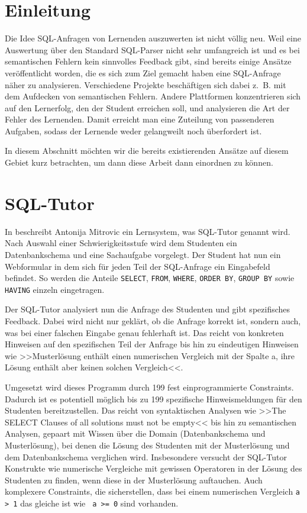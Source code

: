 \section{Einleitung}

Die Idee SQL-Anfragen von Lernenden auszuwerten ist nicht völlig neu. Weil eine Auswertung über den Standard SQL-Parser nicht sehr umfangreich ist und es bei semantischen Fehlern kein sinnvolles Feedback gibt, sind bereits einige Ansätze veröffentlicht worden, die es sich zum Ziel gemacht haben eine SQL-Anfrage näher zu analysieren. Verschiedene Projekte beschäftigen sich dabei \mbox{z. B.} mit dem Aufdecken von semantischen Fehlern. Andere Plattformen konzentrieren sich auf den Lernerfolg, den der Student erreichen soll, und analysieren die Art der Fehler des Lernenden. Damit erreicht man eine Zuteilung von passenderen Aufgaben, sodass der Lernende weder gelangweilt noch überfordert ist. %

In diesem Abschnitt möchten wir die bereits existierenden Ansätze auf diesem Gebiet kurz betrachten, um dann diese Arbeit dann einordnen zu können.

\section{SQL-Tutor}

In \cite{sqltut1} beschreibt Antonija Mitrovic ein Lernsystem, was SQL-Tutor genannt wird. Nach Auswahl einer Schwierigkeitsstufe wird dem Studenten ein Datenbankschema und eine Sachaufgabe vorgelegt. Der Student hat nun ein Webformular in dem sich für jeden Teil der SQL-Anfrage ein Eingabefeld befindet. So werden die Anteile \verb|SELECT|, \verb|FROM|, \verb|WHERE|, \verb|ORDER BY|, \verb|GROUP BY| sowie \verb|HAVING| einzeln eingetragen.

Der SQL-Tutor analysiert nun die Anfrage des Studenten und gibt spezifisches Feedback. Dabei wird nicht nur geklärt, ob die Anfrage korrekt ist, sondern auch, was bei einer falschen Eingabe genau fehlerhaft ist. Das reicht von konkreten Hinweisen auf den spezifischen Teil der Anfrage bis hin zu eindeutigen Hinweisen wie >>Musterlösung enthält einen numerischen Vergleich mit der Spalte a, ihre Lösung enthält aber keinen solchen Vergleich<<.

Umgesetzt wird dieses Programm durch 199 fest einprogrammierte Constraints. Dadurch ist es potentiell möglich bis zu 199 spezifische Hinweismeldungen für den Studenten bereitzustellen. Das reicht von syntaktischen Analysen wie >>The SELECT Clauses of all solutions must not be empty<< bis hin zu semantischen Analysen, gepaart mit Wissen über die Domain (Datenbankschema und Musterlösung), bei denen die Lösung des Studenten mit der Musterlösung und dem Datenbankschema verglichen wird. Insbesondere versucht der SQL-Tutor Konstrukte wie numerische Vergleiche mit gewissen Operatoren in der Lösung des Studenten zu finden, wenn diese in der Musterlösung auftauchen. Auch komplexere Constraints, die sicherstellen, dass bei einem numerischen Vergleich \verb|a > 1| das gleiche ist wie \verb| a >= 0| sind vorhanden. 

